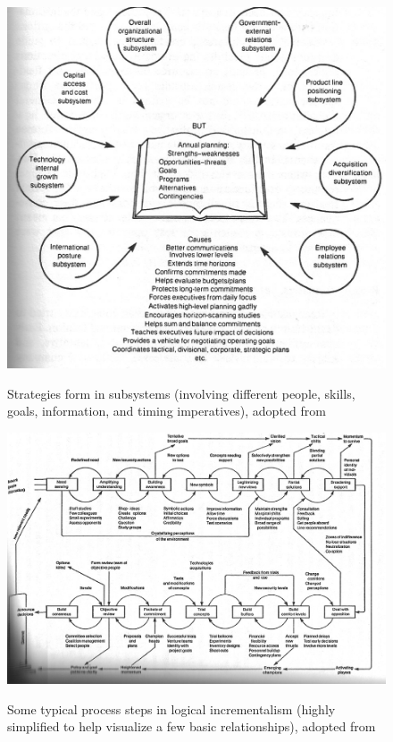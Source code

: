\documentclass[12pt,letterpaper]{article}
\begin{document}
\begin{singlespace}
\begin{figure}[h]
\begin{centering}
  \caption{Strategies form in subsystems (involving different people, skills, goals, information, and timing imperatives), adopted from \cite{Quinn1980}}
  \includegraphics[width=\textwidth]{Quinn1980a}
  \label{fig:Quinn1980a}
\end{centering}
\end{figure}

\begin{figure}[h]
\begin{centering}
  \caption{Some typical process steps in logical incrementalism (highly simplified to help visualize a few basic relationships), adopted from \cite{Quinn1980}}
  \includegraphics[width=\textwidth]{Quinn1980b}
  \label{fig:Quinn1980b}
\end{centering}
\end{figure}


\end{singlespace}
\end{document}
